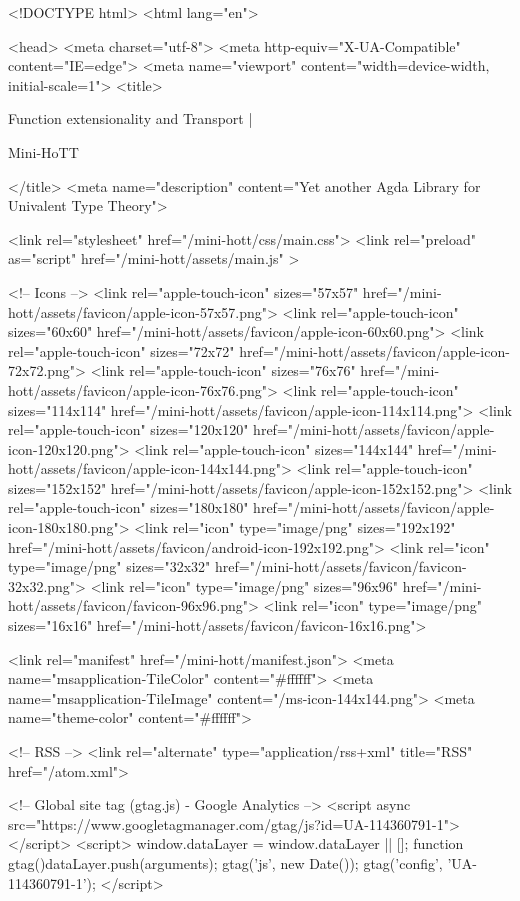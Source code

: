 <!DOCTYPE html>
<html lang="en">

<head>
  <meta charset="utf-8">
  <meta http-equiv="X-UA-Compatible" content="IE=edge">
  <meta name="viewport" content="width=device-width, initial-scale=1">
  <title>
    
      
        Function extensionality and Transport |
      
        Mini-HoTT
    
  </title>
  <meta name="description" content="Yet another Agda Library for Univalent Type Theory">

  <link rel="stylesheet" href="/mini-hott/css/main.css">
  <link rel="preload" as="script" href="/mini-hott/assets/main.js" >

  <!-- Icons -->
  <link rel="apple-touch-icon" sizes="57x57" href="/mini-hott/assets/favicon/apple-icon-57x57.png">
  <link rel="apple-touch-icon" sizes="60x60" href="/mini-hott/assets/favicon/apple-icon-60x60.png">
  <link rel="apple-touch-icon" sizes="72x72" href="/mini-hott/assets/favicon/apple-icon-72x72.png">
  <link rel="apple-touch-icon" sizes="76x76" href="/mini-hott/assets/favicon/apple-icon-76x76.png">
  <link rel="apple-touch-icon" sizes="114x114" href="/mini-hott/assets/favicon/apple-icon-114x114.png">
  <link rel="apple-touch-icon" sizes="120x120" href="/mini-hott/assets/favicon/apple-icon-120x120.png">
  <link rel="apple-touch-icon" sizes="144x144" href="/mini-hott/assets/favicon/apple-icon-144x144.png">
  <link rel="apple-touch-icon" sizes="152x152" href="/mini-hott/assets/favicon/apple-icon-152x152.png">
  <link rel="apple-touch-icon" sizes="180x180" href="/mini-hott/assets/favicon/apple-icon-180x180.png">
  <link rel="icon" type="image/png" sizes="192x192"  href="/mini-hott/assets/favicon/android-icon-192x192.png">
  <link rel="icon" type="image/png" sizes="32x32" href="/mini-hott/assets/favicon/favicon-32x32.png">
  <link rel="icon" type="image/png" sizes="96x96" href="/mini-hott/assets/favicon/favicon-96x96.png">
  <link rel="icon" type="image/png" sizes="16x16" href="/mini-hott/assets/favicon/favicon-16x16.png">

  <link rel="manifest" href="/mini-hott/manifest.json">
  <meta name="msapplication-TileColor" content="#ffffff">
  <meta name="msapplication-TileImage" content="/ms-icon-144x144.png">
  <meta name="theme-color" content="#ffffff">

  <!-- RSS -->
  <link rel="alternate" type="application/rss+xml" title="RSS" href="/atom.xml">

  <!-- Global site tag (gtag.js) - Google Analytics -->
  <script async src="https://www.googletagmanager.com/gtag/js?id=UA-114360791-1"></script>
  <script>
    window.dataLayer = window.dataLayer || [];
    function gtag(){dataLayer.push(arguments);}
    gtag('js', new Date());
    gtag('config', 'UA-114360791-1');
  </script>

